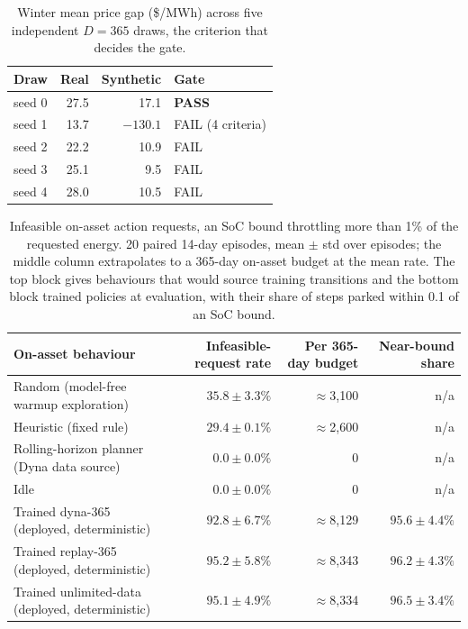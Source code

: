 \documentclass[conference]{IEEEtran}
\begin{document}
\begin{table}[htbp]
\centering
\caption{Winter mean price gap (\$/MWh) across five independent $D{=}365$ draws, the criterion that decides the gate.}
\label{tab:gate-seeds}
\small
\begin{tabular}{lrrl}
\toprule
Draw & Real & Synthetic & Gate \\
\midrule
seed 0 & 27.5 & 17.1 & \textbf{PASS} \\
seed 1 & 13.7 & $-130.1$ & FAIL (4 criteria) \\
seed 2 & 22.2 & 10.9 & FAIL \\
seed 3 & 25.1 & 9.5 & FAIL \\
seed 4 & 28.0 & 10.5 & FAIL \\
\bottomrule
\end{tabular}
\end{table}

\begin{table}[htbp]
\centering
\caption{Infeasible on-asset action requests, an SoC bound throttling more than 1\% of the requested energy. 20 paired 14-day episodes, mean $\pm$ std over episodes; the middle column extrapolates to a 365-day on-asset budget at the mean rate. The top block gives behaviours that would source training transitions and the bottom block trained policies at evaluation, with their share of steps parked within 0.1 of an SoC bound.}
\label{tab:safe-exploration}
\begin{tabular}{lrrr}
\toprule
On-asset behaviour & Infeasible-request rate & Per 365-day budget & Near-bound share \\
\midrule
Random (model-free warmup exploration) & $35.8\pm3.3\%$ & $\approx$3{,}100 & n/a \\
Heuristic (fixed rule) & $29.4\pm0.1\%$ & $\approx$2{,}600 & n/a \\
Rolling-horizon planner (Dyna data source) & $0.0\pm0.0\%$ & 0 & n/a \\
Idle & $0.0\pm0.0\%$ & 0 & n/a \\
\midrule
Trained dyna-365 (deployed, deterministic) & $92.8\pm6.7\%$ & $\approx$8{,}129 & $95.6\pm4.4\%$ \\
Trained replay-365 (deployed, deterministic) & $95.2\pm5.8\%$ & $\approx$8{,}343 & $96.2\pm4.3\%$ \\
Trained unlimited-data (deployed, deterministic) & $95.1\pm4.9\%$ & $\approx$8{,}334 & $96.5\pm3.4\%$ \\
\bottomrule
\end{tabular}
\end{table}
\end{document}

